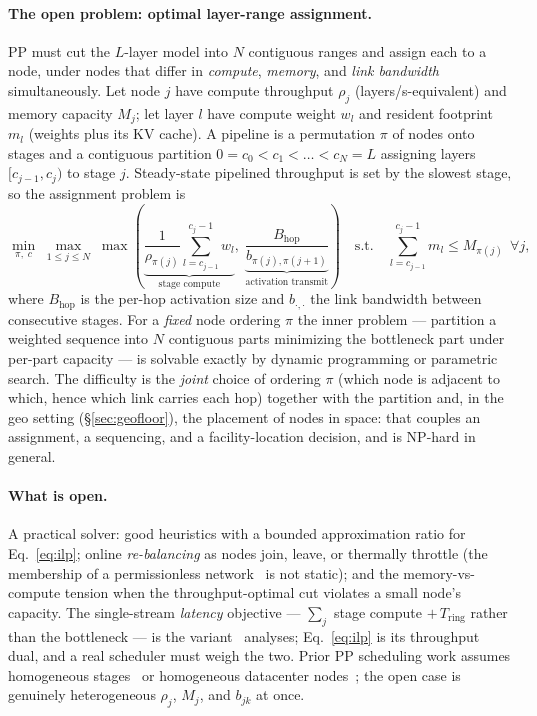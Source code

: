 \documentclass[11pt]{article}
\newcommand{\Tring}{\ensuremath{T_{\mathrm{ring}}}}
\begin{document}
\paragraph{The open problem: optimal layer-range assignment.} PP must cut the $L$-layer model into $N$
contiguous ranges and assign each to a node, under nodes that differ in \emph{compute}, \emph{memory}, and
\emph{link bandwidth} simultaneously. Let node $j$ have compute throughput $\rho_j$ (layers/s-equivalent)
and memory capacity $M_j$; let layer $l$ have compute weight $w_l$ and resident footprint $m_l$ (weights
plus its KV cache). A pipeline is a permutation $\pi$ of nodes onto stages and a contiguous partition
$0=c_0<c_1<\dots<c_N=L$ assigning layers $[c_{j-1},c_j)$ to stage $j$. Steady-state pipelined throughput is
set by the slowest stage, so the assignment problem is
\begin{equation}
\min_{\pi,\;c}\;\max_{1\le j\le N}\;
\max\!\left(\underbrace{\frac{1}{\rho_{\pi(j)}}\sum_{l=c_{j-1}}^{c_j-1} w_l}_{\text{stage compute}},\;
\underbrace{\frac{B_{\mathrm{hop}}}{b_{\pi(j),\pi(j+1)}}}_{\text{activation transmit}}\right)
\quad\text{s.t.}\quad
\sum_{l=c_{j-1}}^{c_j-1} m_l \le M_{\pi(j)}\ \ \forall j,
\label{eq:ilp}
\end{equation}
where $B_{\mathrm{hop}}$ is the per-hop activation size and $b_{\cdot,\cdot}$ the link bandwidth between
consecutive stages. For a \emph{fixed} node ordering $\pi$ the inner problem --- partition a weighted
sequence into $N$ contiguous parts minimizing the bottleneck part under per-part capacity --- is solvable
exactly by dynamic programming or parametric search. The difficulty is the \emph{joint} choice of ordering
$\pi$ (which node is adjacent to which, hence which link carries each hop) together with the partition and,
in the geo setting (\S\ref{sec:geofloor}), the placement of nodes in space: that couples an assignment, a
sequencing, and a facility-location decision, and is NP-hard in general.

\paragraph{What is open.} A practical solver: good heuristics with a bounded approximation ratio for
Eq.~\eqref{eq:ilp}; online \emph{re-balancing} as nodes join, leave, or thermally throttle (the membership
of a permissionless network~\cite{consensus} is not static); and the memory-vs-compute tension when the
throughput-optimal cut violates a small node's capacity. The single-stream \emph{latency} objective ---
$\sum_j$ stage compute $+\,\Tring$ rather than the bottleneck --- is the variant~\cite{latency} analyses;
Eq.~\eqref{eq:ilp} is its throughput dual, and a real scheduler must weigh the two. Prior PP scheduling
work assumes homogeneous stages~\cite{gpipe} or homogeneous datacenter nodes~\cite{pipedream}; the open
case is genuinely heterogeneous $\rho_j$, $M_j$, and $b_{jk}$ at once.
\end{document}
